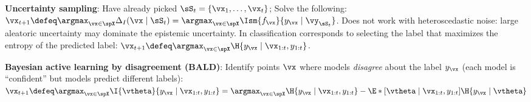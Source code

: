 \textbf{Uncertainty sampling}: Have already picked $\sS_t = \{\vx_1, \dots, \vx_t\}$; Solve the following: $\vx_{t+1} \defeq \argmax_{\vx \in \spX} \Delta_I(\vx \mid \sS_t) = \argmax_{\vx \in \spX} \Ism{f_\vx}{y_{\vx} \mid \vy_{\sS_t}}$. Does not work with heteroscedastic noise: large aleatoric uncertainty may dominate the epistemic uncertainty. In classification corresponds to selecting the label that maximizes the entropy of the predicted label: $\vx_{t+1} \defeq \argmax_{\vx \in \spX} \H{y_{\vx} \mid \vx_{1:t}, y_{1:t}}$. \\
\begin{framed}
    \textbf{Bayesian active learning by disagreement (BALD)}: Identify points $\vx$ where models \emph{disagree} about the label $y_{\vx}$ (each model is ``confident'' but models predict different labels): $\vx_{t+1} \defeq \argmax_{\vx \in \spX} \I{\vtheta}{y_{\vx} \mid \vx_{1:t}, y_{1:t}} = \argmax_{\vx \in \spX} \H{y_{\vx} \mid \vx_{1:t}, y_{1:t}} - \E*[\vtheta \mid \vx_{1:t}, y_{1:t}]{\H{y_{\vx} \mid \vtheta}}$ 
\end{framed}
